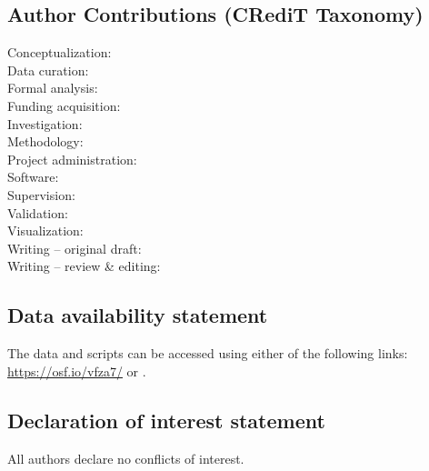\documentclass[
  man, donotrepeattitle,mask,floatsintext]{apa7}
\begin{document}
\vspace{3em}

\hypertarget{author-contributions-credit-taxonomy}{%
\subsection{Author Contributions (CRediT Taxonomy)}\label{author-contributions-credit-taxonomy}}

\noindent Conceptualization: \\
\noindent Data curation: \\
\noindent Formal analysis: \\
\noindent Funding acquisition: \\
\noindent Investigation: \\
\noindent Methodology: \\
\noindent Project administration: \\
\noindent Software: \\
\noindent Supervision: \\
\noindent Validation: \\
\noindent Visualization: \\
\noindent Writing -- original draft: \\
\noindent Writing -- review \& editing: 

\hypertarget{data-availability-statement}{%
\subsection{Data availability statement}\label{data-availability-statement}}

\noindent The data and scripts can be accessed using either of the following links: \url{https://osf.io/vfza7/} or .

\hypertarget{declaration-of-interest-statement}{%
\subsection{Declaration of interest statement}\label{declaration-of-interest-statement}}

\noindent All authors declare no conflicts of interest.
\end{document}
